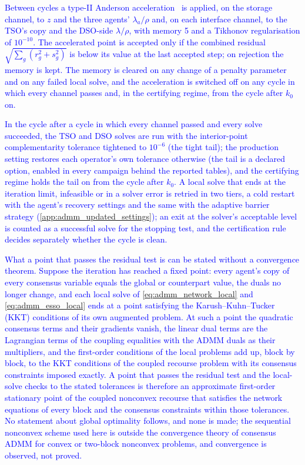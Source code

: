 \documentclass[preprint,12pt]{elsarticle}
\begin{document}
\textcolor{blue}{
    Between cycles a type-II Anderson acceleration~\cite{walker_ni_2011} is applied, on the storage channel, to $z$ and the three agents' $\lambda_a/\rho$ and, on each interface channel, to the TSO's copy and the DSO-side $\lambda/\rho$, with memory 5 and a Tikhonov regularisation of $10^{-10}$. The accelerated point is accepted only if the combined residual $\sqrt{\sum_g (r_g^2 + s_g^2)}$ is below its value at the last accepted step; on rejection the memory is kept. 
    The memory is cleared on any change of a penalty parameter and on any failed local solve, and the acceleration is switched off on any cycle in which every channel passes and, in the certifying regime, from the cycle after $k_0$ on.
}

\textcolor{blue}{
    In the cycle after a cycle in which every channel passed and every solve succeeded, the TSO and DSO solves are run with the interior-point complementarity tolerance tightened to $10^{-6}$ (the tight tail); the production setting restores each operator's own tolerance otherwise (the tail is a declared option, enabled in every campaign behind the reported tables), and the certifying regime holds the tail on from the cycle after $k_0$. A local solve that ends at the iteration limit, infeasible or in a solver error is retried in two tiers, a cold restart with the agent's recovery settings and the same with the adaptive barrier strategy (\ref{app:admm_updated_settings}); an exit at the solver's acceptable level is counted as a successful solve for the stopping test, and the certification rule decides separately whether the cycle is clean.
}

\textcolor{blue}{
    What a point that passes the residual test is can be stated without a convergence theorem. Suppose the iteration has reached a fixed point: every agent's copy of every consensus variable equals the global or counterpart value, the duals no longer change, and each local solve of \eqref{eq:admm_network_local} and \eqref{eq:admm_esso_local} ends at a point satisfying the Karush--Kuhn--Tucker (KKT) conditions of its own augmented problem. At such a point the quadratic consensus terms and their gradients vanish, the linear dual terms are the Lagrangian terms of the coupling equalities with the ADMM duals as their multipliers, and the first-order conditions of the local problems add up, block by block, to the KKT conditions of the coupled recourse problem with its consensus constraints imposed exactly. A point that passes the residual test and the local-solve checks to the stated tolerances is therefore an approximate first-order stationary point of the coupled nonconvex recourse that satisfies the network equations of every block and the consensus constraints within those tolerances. No statement about global optimality follows, and none is made; the sequential nonconvex scheme used here is outside the convergence theory of consensus ADMM for convex or two-block nonconvex problems, and convergence is observed, not proved.
}
\end{document}
